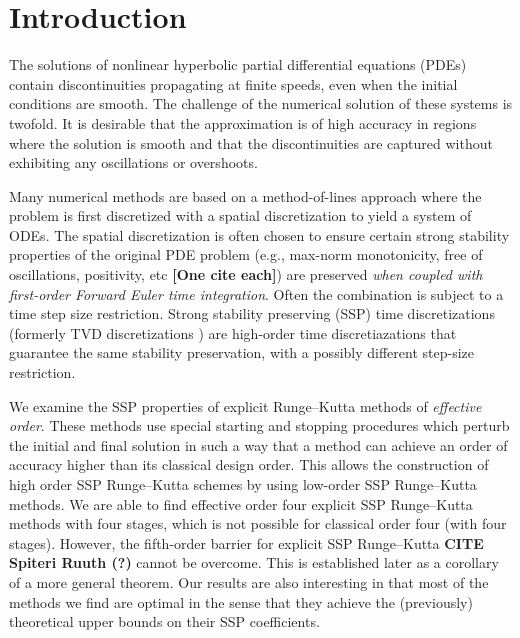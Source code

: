 \section{Introduction}\label{sec:Intro}

The solutions of nonlinear hyperbolic partial differential equations (PDEs) contain discontinuities propagating at finite speeds, even when the initial conditions are smooth.
The challenge of the numerical solution of these systems is twofold.
It is desirable that the approximation is of high accuracy in regions where the solution is smooth and that the discontinuities are captured without exhibiting any oscillations or overshoots.

Many numerical methods are based on a method-of-lines approach where the problem is first discretized with a spatial discretization to yield a system of ODEs.
The spatial discretization is often chosen to ensure certain strong stability properties of the original PDE problem (e.g., max-norm monotonicity, free of oscillations, positivity, etc {\bf [One cite each]}) are preserved \emph{when coupled with first-order Forward Euler time integration}.
Often the combination is subject to a time step size restriction.
Strong stability preserving (SSP) time discretizations (formerly TVD discretizations \cite{Gottlieb1998}) are high-order time discretiazations that guarantee the same stability preservation, with a possibly different step-size restriction.


We examine the SSP properties of explicit Runge--Kutta methods of \emph{effective order}.
These methods use special starting and stopping procedures which perturb the initial and final solution in such a way that a method can achieve an order of accuracy higher than its classical design order.
This allows the construction of high order SSP Runge--Kutta schemes by using low-order SSP Runge--Kutta methods.
We are able to find effective order four explicit SSP Runge--Kutta methods with four stages, which is not possible for classical order four (with four stages). However, the fifth-order barrier for explicit SSP Runge--Kutta \textbf{CITE Spiteri Ruuth (?)} cannot be overcome.
This is  established later as a corollary of a more general theorem.
Our results are also interesting in that most of the methods we find are optimal in the sense that they achieve the (previously) theoretical upper bounds on their SSP coefficients.

